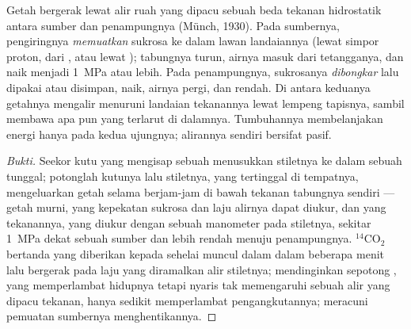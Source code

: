\begin{theorem}\label{thm:b1:plant-transport:pressureflow}
Getah  bergerak lewat alir ruah yang dipacu sebuah beda
tekanan hidrostatik antara sumber dan penampungnya (Münch, 1930). Pada
sumbernya,  pengiringnya \emph{memuatkan} sukrosa ke dalam  lawan landaiannya (lewat simpor proton, dari , atau
lewat );  tabungnya turun, airnya masuk dari
 tetangganya, dan  naik menjadi \qty{1}{MPa} atau lebih.
Pada penampungnya, sukrosanya \emph{dibongkar} lalu dipakai atau
disimpan,  naik, airnya pergi, dan  rendah.
Di antara keduanya getahnya mengalir menuruni landaian tekanannya
lewat lempeng tapisnya, sambil membawa apa pun yang terlarut di
dalamnya. Tumbuhannya membelanjakan energi hanya pada kedua ujungnya;
alirannya sendiri bersifat pasif.
\end{theorem}
\begin{proof}[Bukti]
Seekor kutu  yang mengisap sebuah  menusukkan stiletnya ke
dalam sebuah  tunggal; potonglah kutunya lalu stiletnya,
yang tertinggal di tempatnya, mengeluarkan getah selama berjam-jam di
bawah tekanan tabungnya sendiri --- getah  murni, yang kepekatan
sukrosa dan laju alirnya dapat diukur, dan yang tekanannya, yang
diukur dengan sebuah manometer pada stiletnya, sekitar \qty{1}{MPa}
dekat sebuah sumber dan lebih rendah menuju penampungnya.
$\mathrm{^{14}CO_2}$ bertanda yang diberikan kepada sehelai 
muncul dalam   dalam beberapa menit lalu bergerak pada
laju yang diramalkan alir stiletnya; mendinginkan sepotong ,
yang memperlambat  hidupnya tetapi nyaris tak memengaruhi sebuah
alir yang dipacu tekanan, hanya sedikit memperlambat pengangkutannya;
meracuni pemuatan  sumbernya menghentikannya.
\end{proof}


